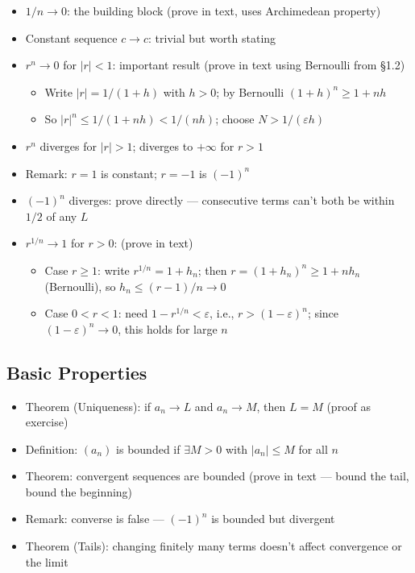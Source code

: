 \documentclass[
  10pt,
  letterpaper,
]{scrbook}
\providecommand{\tightlist}{%
  \setlength{\itemsep}{0pt}\setlength{\parskip}{0pt}}
\begin{document}
\begin{itemize}
\tightlist
\item
  \(1/n \to 0\): the building block (prove in text, uses Archimedean
  property)
\item
  Constant sequence \(c \to c\): trivial but worth stating
\item
  \(r^n \to 0\) for \(|r| < 1\): important result (prove in text using
  Bernoulli from §1.2)

  \begin{itemize}
  \tightlist
  \item
    Write \(|r| = 1/(1+h)\) with \(h > 0\); by Bernoulli
    \((1+h)^n \geq 1 + nh\)
  \item
    So \(|r|^n \leq 1/(1+nh) < 1/(nh)\); choose
    \(N > 1/(\varepsilon h)\)
  \end{itemize}
\item
  \(r^n\) diverges for \(|r| > 1\); diverges to \(+\infty\) for
  \(r > 1\)
\item
  Remark: \(r = 1\) is constant; \(r = -1\) is \((-1)^n\)
\item
  \((-1)^n\) diverges: prove directly --- consecutive terms can't both
  be within \(1/2\) of any \(L\)
\item
  \(r^{1/n} \to 1\) for \(r > 0\): (prove in text)

  \begin{itemize}
  \tightlist
  \item
    Case \(r \geq 1\): write \(r^{1/n} = 1 + h_n\); then
    \(r = (1+h_n)^n \geq 1 + nh_n\) (Bernoulli), so
    \(h_n \leq (r-1)/n \to 0\)
  \item
    Case \(0 < r < 1\): need \(1 - r^{1/n} < \varepsilon\), i.e.,
    \(r > (1-\varepsilon)^n\); since \((1-\varepsilon)^n \to 0\), this
    holds for large \(n\)
  \end{itemize}
\end{itemize}

\subsection{Basic Properties}\label{basic-properties}

\begin{itemize}
\tightlist
\item
  Theorem (Uniqueness): if \(a_n \to L\) and \(a_n \to M\), then
  \(L = M\) (proof as exercise)
\item
  Definition: \((a_n)\) is bounded if \(\exists M > 0\) with
  \(|a_n| \leq M\) for all \(n\)
\item
  Theorem: convergent sequences are bounded (prove in text --- bound the
  tail, bound the beginning)
\item
  Remark: converse is false --- \((-1)^n\) is bounded but divergent
\item
  Theorem (Tails): changing finitely many terms doesn't affect
  convergence or the limit
\end{itemize}
\end{document}
